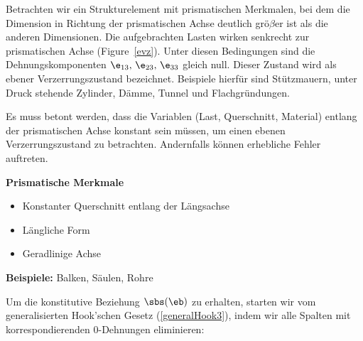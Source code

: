 Betrachten wir ein Strukturelement mit prismatischen Merkmalen, bei dem die Dimension in Richtung der prismatischen Achse deutlich grö$\beta$er ist als die anderen Dimensionen. Die aufgebrachten Lasten wirken senkrecht zur prismatischen Achse (Figure~\ref{evz}). Unter diesen Bedingungen sind die Dehnungskomponenten $\e_{13},\, \e_{23}, \, \e_{33}$ gleich null. Dieser Zustand wird als ebener Verzerrungszustand bezeichnet. Beispiele hierfür sind Stützmauern, unter Druck stehende Zylinder, Dämme, Tunnel und Flachgründungen.

Es muss betont werden, dass die Variablen (Last, Querschnitt, Material) entlang der prismatischen Achse konstant sein müssen, um einen ebenen Verzerrungszustand zu betrachten. Andernfalls können erhebliche Fehler auftreten.

\begin{framed}
\textbf{Prismatische Merkmale}\\
\begin{itemize}
\item Konstanter Querschnitt entlang der Längsachse
\item Längliche Form
\item Geradlinige Achse
\end{itemize}

\textbf{Beispiele:} Balken, Säulen, Rohre
\end{framed}

Um die konstitutive Beziehung $\sbs(\eb)$ zu erhalten, starten wir vom generalisierten Hook'schen Gesetz (\ref{generalHook3}), indem wir alle Spalten mit korrespondierenden 0-Dehnungen eliminieren:

